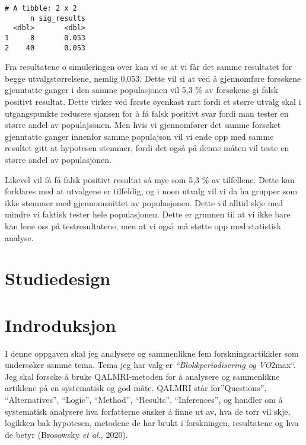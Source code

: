 \documentclass[
  letterpaper,
  DIV=11,
  numbers=noendperiod]{scrreprt}
\begin{document}
\begin{verbatim}
# A tibble: 2 x 2
      n sig_results
  <dbl>       <dbl>
1     8       0.053
2    40       0.053
\end{verbatim}

Fra resultatene o simuleringen over kan vi se at vi får det samme
resultatet for begge utvalgstørrelsene, nemlig 0,053. Dette vil si at
ved å gjennomføre forsøkene gjenntatte ganger i den samme populasjonen
vil 5,3 \% av forsøkene gi falsk positivt resultat. Dette virker ved
første øyenkast rart fordi et større utvalg skal i utgangspunkte
redusere sjansen for å få falsk positivt svar fordi man tester en større
andel av populajsonen. Men hvis vi gjennomfører det samme forsøket
gjenntatte ganger innenfor samme populajson vil vi ende opp med samme
resultet gitt at hypotesen stemmer, fordi det også på denne måten vil
teste en større andel av populasjonen.

Likevel vil få få falsk positivt resultat så mye som 5,3 \% av
tilfellene. Dette kan forklares med at utvalgene er tilfeldig, og i noen
utvalg vil vi da ha grupper som ikke stemmer med gjennomsnittet av
populasjonen. Dette vil alltid skje med mindre vi faktisk tester hele
populasjonen. Dette er grunnen til at vi ikke bare kan lene oss på
testresultatene, men at vi også må støtte opp med statistisk analyse.


\chapter{Studiedesign}\label{studiedesign}


\chapter{Indroduksjon}\label{indroduksjon}

I denne oppgaven skal jeg analysere og sammenlikne fem
forskningsartikkler som undersøker samme tema. Tema jeg har valg er
\emph{``Blokkperiodisering og VO}2max``. Jeg skal forsøke å bruke
QALMRI-metoden for å analysere og sammenlikne artiklene på en
systematisk og god måte. QALMRI står for''Questions'', ``Alternatives'',
``Logic'', ``Method'', ``Results'', ``Inferences'', og handler om å
systematisk analysere hva forfatterne ønsker å finne ut av, hva de torr
vil skje, logikken bak hypotesen, metodene de har brukt i forskningen,
resultatene og hva de betyr (Brosowsky \emph{et al.}, 2020).
\end{document}
